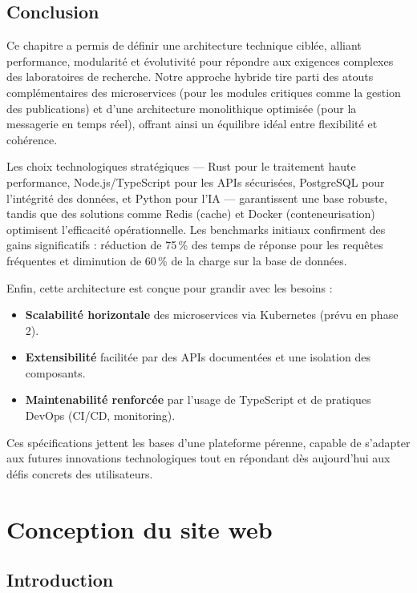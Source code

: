 \documentclass{rapportPfe}
\begin{document}
\section{Conclusion}
Ce chapitre a permis de définir une architecture technique ciblée, alliant performance, modularité et évolutivité pour répondre aux exigences complexes des laboratoires de recherche. Notre approche hybride tire parti des atouts complémentaires des microservices (pour les modules critiques comme la gestion des publications) et d'une architecture monolithique optimisée (pour la messagerie en temps réel), offrant ainsi un équilibre idéal entre flexibilité et cohérence.

Les choix technologiques stratégiques — Rust pour le traitement haute performance, Node.js/TypeScript pour les APIs sécurisées, PostgreSQL pour l’intégrité des données, et Python pour l’IA — garantissent une base robuste, tandis que des solutions comme Redis (cache) et Docker (conteneurisation) optimisent l’efficacité opérationnelle. Les benchmarks initiaux confirment des gains significatifs : réduction de 75\,\% des temps de réponse pour les requêtes fréquentes et diminution de 60\,\% de la charge sur la base de données.

Enfin, cette architecture est conçue pour grandir avec les besoins :

\begin{itemize}
    \item \textbf{Scalabilité horizontale} des microservices via Kubernetes (prévu en phase 2).
    \item \textbf{Extensibilité} facilitée par des APIs documentées et une isolation des composants.
    \item \textbf{Maintenabilité renforcée} par l’usage de TypeScript et de pratiques DevOps (CI/CD, monitoring).
\end{itemize}

Ces spécifications jettent les bases d’une plateforme pérenne, capable de s’adapter aux futures innovations technologiques tout en répondant dès aujourd’hui aux défis concrets des utilisateurs.

\chapter{Conception du site web}

\section{Introduction}
\end{document}
